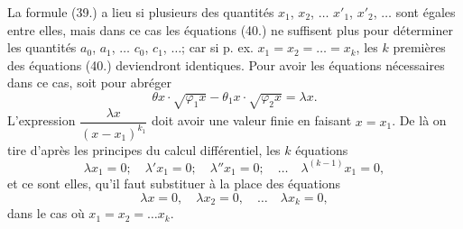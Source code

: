 \documentclass{article}
\begin{document}
La formule (39.) a lieu si plusieurs des quantités $x_1$, $x_2$, $\ldots$ $x'_1$, $x'_2$, $\ldots$ sont égales entre elles, mais dans ce cas les équations (40.) ne suffisent plus pour déterminer les quantités $a_0$, $a_1$, $\ldots$ $c_0$, $c_1$, $\ldots$; car si p. ex. $x_1 = x_2 = \ldots = x_k$, les $k$ premières des équations (40.) deviendront identiques. Pour avoir les équations nécessaires dans ce cas, soit pour abréger
\[ \theta x \cdot \sqrt{\varphi_1 x} - \theta_1 x \cdot \sqrt{\varphi_2 x} = \lambda x. \]
L'expression $\dfrac{\lambda x}{(x-x_1)^{k_1}}$ doit avoir une valeur finie en faisant $x = x_1$. De là on tire d'après les principes du calcul différentiel, les $k$ équations
\[ \lambda x_1 = 0; \quad \lambda'x_1 = 0; \quad \lambda''x_1 = 0; \quad \ldots \quad \lambda^{(k-1)}x_1 = 0, \tag{42} \]
et ce sont elles, qu'il faut substituer à la place des équations
\[ \lambda x = 0, \quad \lambda x_2 = 0, \quad \ldots \quad \lambda x_k = 0, \]
dans le cas où $x_1 = x_2 = \ldots x_k$.
\end{document}
